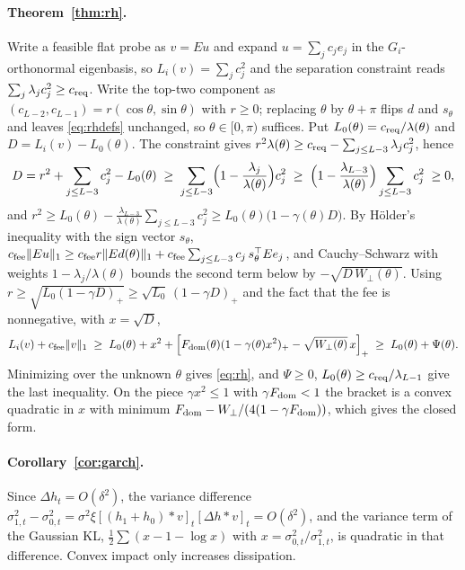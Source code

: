 \paragraph{Theorem~\ref{thm:rh}.} Write a feasible flat probe as $v=Eu$ and expand $u=\sum_jc_je_j$ in the $G_i$-orthonormal eigenbasis, so $L_i(v)=\sum_jc_j^2$ and the separation constraint reads $\sum_j\lambda_jc_j^2\ge c_{\rm req}$. Write the top-two component as $(c_{L-2},c_{L-1})=r(\cos\theta,\sin\theta)$ with $r\ge0$; replacing $\theta$ by $\theta+\pi$ flips $d$ and $s_\theta$ and leaves \eqref{eq:rhdefs} unchanged, so $\theta\in[0,\pi)$ suffices. Put $L_0(\theta)=c_{\rm req}/\lambda(\theta)$ and $D=L_i(v)-L_0(\theta)$. The constraint gives $r^2\lambda(\theta)\ge c_{\rm req}-\sum_{j\le L-3}\lambda_jc_j^2$, hence
\[
D=r^2+\sum_{j\le L-3}c_j^2-L_0(\theta)\;\ge\;\sum_{j\le L-3}\Bigl(1-\frac{\lambda_j}{\lambda(\theta)}\Bigr)c_j^2\;\ge\;\Bigl(1-\frac{\lambda_{L-3}}{\lambda(\theta)}\Bigr)\sum_{j\le L-3}c_j^2\;\ge0,
\]
and $r^2\ge L_0(\theta)-\frac{\lambda_{L-3}}{\lambda(\theta)}\sum_{j\le L-3}c_j^2\ge L_0(\theta)\bigl(1-\gamma(\theta)D\bigr)$. By H\"older's inequality with the sign vector $s_\theta$, $c_{\rm fee}\|Eu\|_1\ge c_{\rm fee}r\|Ed(\theta)\|_1+c_{\rm fee}\sum_{j\le L-3}c_j\,s_\theta^\top Ee_j$, and Cauchy--Schwarz with weights $1-\lambda_j/\lambda(\theta)$ bounds the second term below by $-\sqrt{D\,W_\perp(\theta)}$. Using $r\ge\sqrt{L_0(1-\gamma D)_+}\ge\sqrt{L_0}\,(1-\gamma D)_+$ and the fact that the fee is nonnegative, with $x=\sqrt D$,
\[
L_i(v)+c_{\rm fee}\|v\|_1\;\ge\;L_0(\theta)+x^2+\Bigl[F_{\rm dom}(\theta)(1-\gamma(\theta)x^2)_+-\sqrt{W_\perp(\theta)}\,x\Bigr]_+\;\ge\;L_0(\theta)+\Psi(\theta).
\]
Minimizing over the unknown $\theta$ gives \eqref{eq:rh}, and $\Psi\ge0$, $L_0(\theta)\ge c_{\rm req}/\lambda_{L-1}$ give the last inequality. On the piece $\gamma x^2\le1$ with $\gamma F_{\rm dom}<1$ the bracket is a convex quadratic in $x$ with minimum $F_{\rm dom}-W_\perp/(4(1-\gamma F_{\rm dom}))$, which gives the closed form.

\paragraph{Corollary~\ref{cor:garch}.} Since $\Delta h_t=O(\delta^2)$, the variance difference $\sigma^2_{1,t}-\sigma^2_{0,t}=\sigma^2\xi[(h_1+h_0)*v]_t[\Delta h*v]_t=O(\delta^2)$, and the variance term of the Gaussian KL, $\tfrac12\sum(x-1-\log x)$ with $x=\sigma^2_{0,t}/\sigma^2_{1,t}$, is quadratic in that difference. Convex impact only increases dissipation.


